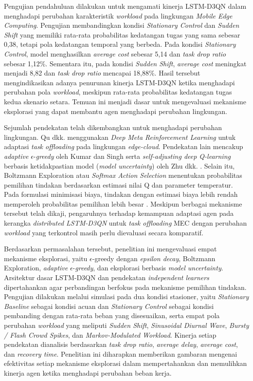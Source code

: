 Pengujian pendahuluan dilakukan untuk mengamati kinerja LSTM-D3QN dalam menghadapi perubahan karakteristik \textit{workload} pada lingkungan \textit{Mobile Edge Computing}. Pengujian membandingkan kondisi \textit{Stationary Control} dan \textit{Sudden Shift} yang memiliki rata-rata probabilitas kedatangan tugas yang sama sebesar 0,38, tetapi pola kedatangan temporal yang berbeda. Pada kondisi \textit{Stationary Control}, model menghasilkan \textit{average cost} sebesar 5,14 dan \textit{task drop ratio} sebesar 1,12\%. Sementara itu, pada kondisi \textit{Sudden Shift}, \textit{average cost} meningkat menjadi 8,82 dan \textit{task drop ratio} mencapai 18,88\%. Hasil tersebut mengindikasikan adanya penurunan kinerja LSTM-D3QN ketika menghadapi perubahan pola \textit{workload}, meskipun rata-rata probabilitas kedatangan tugas kedua skenario setara. Temuan ini menjadi dasar untuk mengevaluasi mekanisme eksplorasi yang dapat membantu agen menghadapi perubahan lingkungan.

Sejumlah pendekatan telah dikembangkan untuk menghadapi perubahan lingkungan. Qu dkk. \cite{qu2021dmro} menggunakan \textit{Deep Meta Reinforcement Learning} untuk adaptasi \textit{task offloading} pada lingkungan \textit{edge-cloud}. Pendekatan lain mencakup \textit{adaptive} $\epsilon$-\textit{greedy} oleh Kumar dan Singh \cite{kumar2024adaptive} serta \textit{self-adjusting deep Q-learning} berbasis ketidakpastian model (\textit{model uncertainty}) oleh Zhu dkk. \cite{zhu2022adaptive}. Selain itu, Boltzmann Exploration atau \textit{Softmax Action Selection} menentukan probabilitas pemilihan tindakan berdasarkan estimasi nilai Q dan parameter temperatur. Pada formulasi minimisasi biaya, tindakan dengan estimasi biaya lebih rendah memperoleh probabilitas pemilihan lebih besar \cite{zangirolami2024dealing, asadi2017alternative}. Meskipun berbagai mekanisme tersebut telah dikaji, pengaruhnya terhadap kemampuan adaptasi agen pada kerangka \textit{distributed LSTM-D3QN} untuk \textit{task offloading} MEC dengan perubahan \textit{workload} yang terkontrol masih perlu dievaluasi secara komparatif.

Berdasarkan permasalahan tersebut, penelitian ini mengevaluasi empat mekanisme eksplorasi, yaitu $\epsilon$-greedy dengan \textit{epsilon decay}, Boltzmann Exploration, \textit{adaptive} $\epsilon$-\textit{greedy}, dan eksplorasi berbasis \textit{model uncertainty}. Arsitektur dasar LSTM-D3QN dan pendekatan \textit{independent learners} dipertahankan agar perbandingan berfokus pada mekanisme pemilihan tindakan. Pengujian dilakukan melalui simulasi pada dua kondisi stasioner, yaitu \textit{Stationary Baseline} sebagai kondisi acuan dan \textit{Stationary Control} sebagai kondisi pembanding dengan rata-rata beban yang disesuaikan, serta empat pola perubahan \textit{workload} yang meliputi \textit{Sudden Shift}, \textit{Sinusoidal Diurnal Wave}, \textit{Bursty / Flash Crowd Spikes}, dan \textit{Markov-Modulated Workload}. Kinerja setiap pendekatan dianalisis berdasarkan \textit{task drop ratio}, \textit{average delay}, \textit{average cost}, dan \textit{recovery time}. Penelitian ini diharapkan memberikan gambaran mengenai efektivitas setiap mekanisme eksplorasi dalam mempertahankan dan memulihkan kinerja agen ketika menghadapi perubahan beban kerja.

